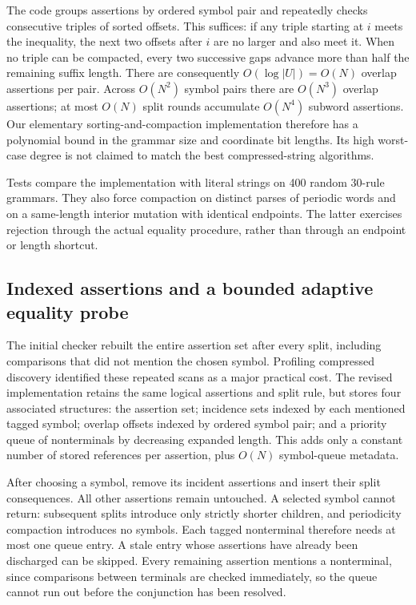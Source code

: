 The code groups assertions by ordered symbol pair and repeatedly checks
consecutive triples of sorted offsets.  This suffices: if any triple
starting at $i$ meets the inequality, the next two offsets after $i$ are
no larger and also meet it.  When no triple can be compacted, every two
successive gaps advance more than half the remaining suffix length.
There are consequently $O(\log |U|)=O(N)$ overlap assertions per pair.
Across $O(N^2)$ symbol pairs there are $O(N^3)$ overlap assertions; at most
$O(N)$ split rounds accumulate $O(N^4)$ subword assertions.  Our elementary
sorting-and-compaction implementation therefore has a polynomial bound in
the grammar size and coordinate bit lengths.  Its high worst-case degree
is not claimed to match the best compressed-string algorithms.

Tests compare the implementation with literal strings on 400 random
30-rule grammars.  They also force compaction on distinct parses of periodic
words and on a same-length interior mutation with identical endpoints.
The latter exercises rejection through the actual equality procedure,
rather than through an endpoint or length shortcut.

\subsection{Indexed assertions and a bounded adaptive equality probe}
\label{sec:indexed-equality}

The initial checker rebuilt the entire assertion set after every split,
including comparisons that did not mention the chosen symbol. Profiling
compressed discovery identified these repeated scans as a major practical
cost. The revised implementation retains the same logical assertions and
split rule, but stores four associated structures: the assertion set;
incidence sets indexed by each mentioned tagged symbol; overlap offsets
indexed by ordered symbol pair; and a priority queue of nonterminals by
decreasing expanded length. This adds only a constant number of stored
references per assertion, plus $O(N)$ symbol-queue metadata.

After choosing a symbol, remove its incident assertions and insert their
split consequences. All other assertions remain untouched. A selected
symbol cannot return: subsequent splits introduce only strictly shorter
children, and periodicity compaction introduces no symbols. Each tagged
nonterminal therefore needs at most one queue entry. A stale entry whose
assertions have already been discharged can be skipped. Every remaining
assertion mentions a nonterminal, since comparisons between terminals are
checked immediately, so the queue cannot run out before the conjunction
has been resolved.

